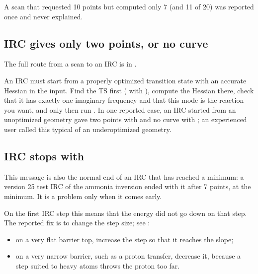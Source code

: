 \documentclass[letterpaper,10pt,english,openany,oneside]{sphinxmanual}
\begin{document}
\sphinxAtStartPar
A scan that requested 10 points but computed only 7 (and 11 of 20) was reported once and never explained.




\subsection{IRC gives only two points, or no curve}
\label{\detokenize{troubleshooting/common-problems:irc-gives-only-two-points-or-no-curve}}
\sphinxAtStartPar
The full route from a scan to an IRC is in {\hyperref[\detokenize{tasks/ts-irc-scan::doc}]{}}.

\sphinxAtStartPar
An IRC must start from a properly optimized transition state with an accurate Hessian in the input. Find the TS
first ( with {\hyperref[\detokenize{reference/optimize:optimize-saddle}]{}}), compute the Hessian there, check that it has exactly
one imaginary frequency and that this mode is the reaction you want, and only then run . In one reported
case, an IRC started from an unoptimized geometry gave two points with {\hyperref[\detokenize{reference/optimize:optimize-back}]{}} and no curve
with ; an experienced user called this typical of an under\sphinxhyphen{}optimized geometry.




\subsection{IRC stops with }
\label{\detokenize{troubleshooting/common-problems:irc-stops-with-vicinity-of-a-stationary-point-stop}}
\sphinxAtStartPar
This message is also the normal end of an IRC that has reached a minimum: a version 25 test IRC of the ammonia
inversion ended with it after 7 points, at the minimum. It is a problem only when it comes early.



\sphinxAtStartPar
On the first IRC step this means that the energy did not go down on that step. The reported fix is to change the
step size; see {\hyperref[\detokenize{reference/optimize:optimize-radius}]{}}:
\begin{itemize}
\item {} 
\sphinxAtStartPar
on a very flat barrier top, increase the step so that it reaches the slope;

\item {} 
\sphinxAtStartPar
on a very narrow barrier, such as a proton transfer, decrease it, because a step suited to heavy atoms throws the
proton too far.

\end{itemize}
\end{document}
